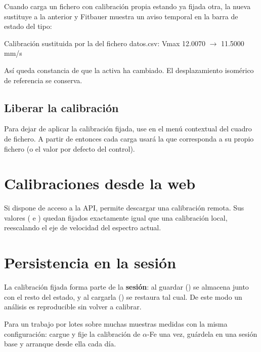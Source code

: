 Cuando carga un fichero con calibración propia estando ya fijada otra, la nueva
sustituye a la anterior y Fitbauer muestra un aviso temporal en la barra de
estado del tipo:

\begin{center}\ttfamily\small
Calibración sustituida por la del fichero datos.csv: Vmax 12.0070 $\to$ 11.5000 mm/s
\end{center}

Así queda constancia de que la  activa ha cambiado. El
desplazamiento isomérico de referencia se conserva.

\subsection{Liberar la calibración}

Para dejar de aplicar la calibración fijada, use  en el menú contextual del cuadro de fichero. A partir de entonces cada
carga usará la  que corresponda a su propio fichero (o el valor por
defecto del control).

\section{Calibraciones desde la web}

Si dispone de acceso a la API,  permite
descargar una calibración remota. Sus valores ( e
) quedan fijados exactamente igual que una calibración
local, reescalando el eje de velocidad del espectro actual.

\section{Persistencia en la sesión}

La calibración fijada forma parte de la \textbf{sesión}: al guardar
() se almacena junto con el resto del estado, y
al cargarla () se restaura tal cual. De este modo
un análisis es reproducible sin volver a calibrar.

\begin{truco}
Para un trabajo por lotes sobre muchas muestras medidas con la misma
configuración: cargue y fije la calibración de $\alpha$-Fe una vez, guárdela en
una sesión base y arranque desde ella cada día.
\end{truco}
